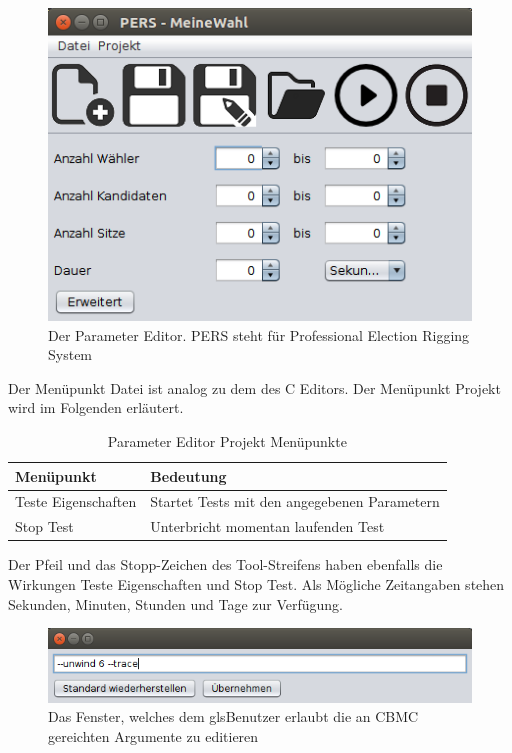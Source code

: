 \documentclass[a4paper]{scrreprt}
\begin{document}
\begin{figure}[H]
\includegraphics[scale=0.6]{Parameter-Editor.png}
\caption{Der Parameter Editor. PERS steht für Professional Election Rigging System}
\label{Parameter-editor}
\end{figure}

Der Menüpunkt Datei ist analog zu dem des C Editors. Der Menüpunkt Projekt wird im Folgenden erläutert. 

\begin{table}[H]
\begin{tabular}{|p{5cm}|p{10cm}|}
Menüpunkt & Bedeutung \\
\hline
Teste Eigenschaften & Startet Tests mit den angegebenen Parametern \\
Stop Test & Unterbricht momentan laufenden Test
\end{tabular}
\label{Parameter-Projekt-Menü}
\caption{Parameter Editor Projekt Menüpunkte}
\end{table}

Der Pfeil und das Stopp-Zeichen des Tool-Streifens haben ebenfalls die Wirkungen Teste Eigenschaften und Stop Test. Als Mögliche Zeitangaben stehen Sekunden, Minuten, Stunden und Tage zur Verfügung. 

\begin{figure}[H]
\includegraphics[scale=0.6]{CBMC-Args-Editor.png}
\caption{Das Fenster, welches dem gls{Benutzer} erlaubt die an CBMC gereichten Argumente zu editieren}
\label{Argumente-editor}
\end{figure}
\end{document}
